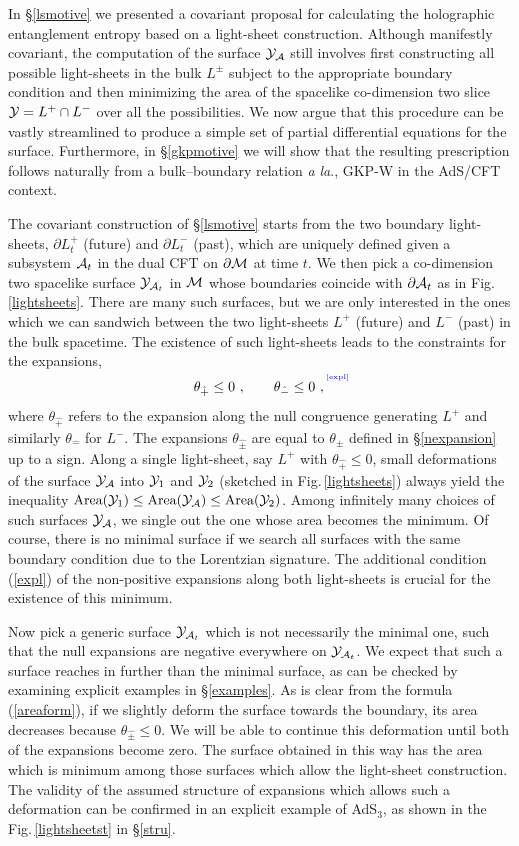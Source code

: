 \documentclass[12pt]{article}
\newcommand{\be}{\begin{equation}}
\newcommand{\ee}{\end{equation}}
\def\sec#1{\S \;\ref{#1}}
\def\fig#1{Fig.\,\ref{#1}}
\def\req#1{(\ref{#1})}
\def\p{\partial}
\def\CA{{\cal A}}
\def\CY{{\cal Y}}
\def\p{\partial}
\def\p{\partial}
\def\Label#1{\label{#1}%
{ \color{blue}{\smash{\hbox to0pt{\raise2ex\hbox{\tiny[#1]}\hss}}}}}
\def\bulk{{\cal M}}
\def\bdy{\p{\cal M}}
\def\Lms{\CY}
\def\rA{\CA}
\def\brA{\p \CA}
\def\de{\partial}
\begin{document}
In \sec{lsmotive} we presented a covariant proposal for calculating
the holographic entanglement entropy based on a light-sheet
construction. Although manifestly covariant, the computation of the
surface $\Lms_\rA$ still involves  first constructing all possible
light-sheets in the bulk $L^\pm$ subject to the appropriate boundary
condition and then minimizing the area of the spacelike co-dimension
two slice $\Lms = L^+ \cap L^-$ over all the possibilities. We now
argue that this procedure can be vastly streamlined to produce a
simple set of partial differential equations for the surface.
Furthermore, in \sec{gkpmotive} we will show that the resulting
prescription follows naturally from a bulk--boundary relation {\it a
la}., GKP-W \cite{Gubser:1998bc, Witten:1998qj} in the AdS/CFT
context.

The covariant construction of \sec{lsmotive} starts from the two
boundary light-sheets, $\de L^+_t$ (future) and $\de L^-_t$ (past),
which are uniquely defined given a subsystem $\rA_t$ in the dual CFT
on $\bdy$ at time $t$. We then pick a co-dimension two spacelike
surface $\Lms_{\rA_t}$  in $\bulk$ whose boundaries coincide with
$\brA_t$ as in \fig{lightsheets}. There are many such surfaces, but
we are only interested in the ones which we can sandwich between the
two light-sheets $L^+$ (future) and $L^-$ (past) in the bulk
spacetime.  The existence of such light-sheets leads to the
constraints for the expansions,
 \be \theta_{\hat{+}}\leq 0\ ,\qquad \theta_{\hat{-}}\leq 0 \ ,
 \Label{expl} \ee
where $\theta_{\hat{+}}$ refers to the expansion along the null
congruence generating $L^+$ and similarly $\theta_{\hat{-}}$ for
$L^-$. The expansions $\theta_{\hat{\pm}}$ are equal to $\theta_\pm$
defined in \sec{nexpansion} up to a  sign.  Along a single
light-sheet, say $L^+$ with $\theta_{\hat{+}}\leq 0$,  small
deformations of the surface $\Lms_{\rA}$ into $\Lms_1$ and $\Lms_2$
(sketched in \fig{lightsheets})  always yield the inequality
$\mbox{Area}(\Lms_1)\leq \mbox{Area}(\Lms_\rA)\leq
\mbox{Area}(\Lms_2)$. Among infinitely many choices of such surfaces $\Lms_{\rA}$, we single out the one whose area becomes the minimum. Of course, there is no minimal surface if we search all surfaces with the same boundary condition due to the Lorentzian  signature. The additional condition \req{expl} of the non-positive  expansions along both light-sheets is crucial for the existence of this minimum.

Now pick a generic surface $\Lms_{\rA_t}$ which is not
necessarily the minimal one, such that
 the null expansions are negative everywhere on
$\Lms_{\rA_t}$. We expect that such a surface reaches in
further than the minimal surface, as can be checked by examining
explicit examples in \sec{examples}. As is clear from the
formula (\ref{areaform}), if we slightly deform the surface
 towards the boundary, its area decreases because
$\theta_{\hat{\pm}}\leq 0$. We will be able to continue this
deformation until both of the expansions become zero. The surface
obtained in this way has the area which is minimum among those
surfaces which allow the light-sheet construction. The validity of
the assumed structure of expansions which allows such a deformation
can be confirmed in an explicit example of AdS$_3$, as shown in the
\fig{lightsheetst} in \sec{stru}. 
\end{document}
